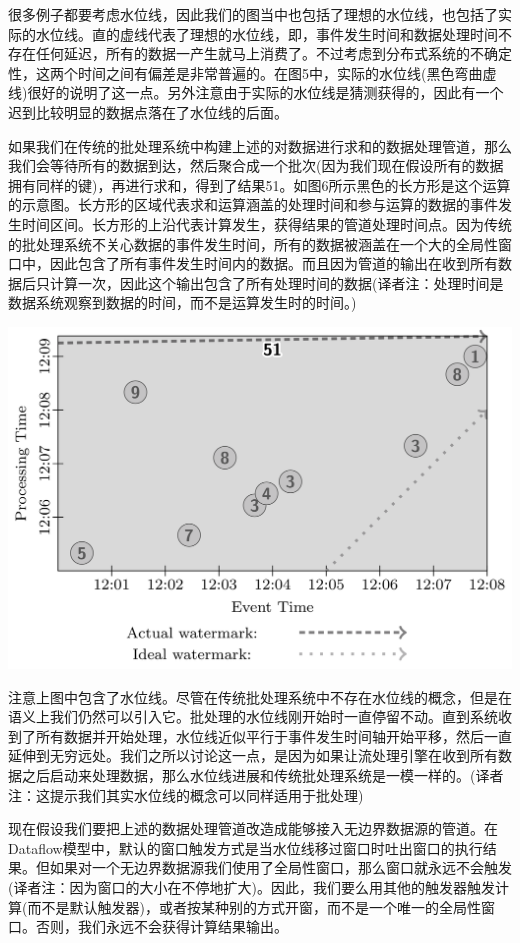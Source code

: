 \documentclass[oneside]{ctexbook}
\begin{document}
很多例子都要考虑水位线，因此我们的图当中也包括了理想的水位线，也包括了实际的水位线。直的虚线代表了理想的水位线，即，事件发生时间和数据处理时间不存在任何延迟，所有的数据一产生就马上消费了。不过考虑到分布式系统的不确定性，这两个时间之间有偏差是非常普遍的。在图5中，实际的水位线(黑色弯曲虚线)很好的说明了这一点。另外注意由于实际的水位线是猜测获得的，因此有一个迟到比较明显的数据点落在了水位线的后面。

如果我们在传统的批处理系统中构建上述的对数据进行求和的数据处理管道，那么我们会等待所有的数据到达，然后聚合成一个批次(因为我们现在假设所有的数据拥有同样的键)，再进行求和，得到了结果51。如图6所示黑色的长方形是这个运算的示意图。长方形的区域代表求和运算涵盖的处理时间和参与运算的数据的事件发生时间区间。长方形的上沿代表计算发生，获得结果的管道处理时间点。因为传统的批处理系统不关心数据的事件发生时间，所有的数据被涵盖在一个大的全局性窗口中，因此包含了所有事件发生时间内的数据。而且因为管道的输出在收到所有数据后只计算一次，因此这个输出包含了所有处理时间的数据(译者注：处理时间是数据系统观察到数据的时间，而不是运算发生时的时间。)

\noindent \includegraphics[width=\textwidth]{batchexecution.png}

注意上图中包含了水位线。尽管在传统批处理系统中不存在水位线的概念，但是在语义上我们仍然可以引入它。批处理的水位线刚开始时一直停留不动。直到系统收到了所有数据并开始处理，水位线近似平行于事件发生时间轴开始平移，然后一直延伸到无穷远处。我们之所以讨论这一点，是因为如果让流处理引擎在收到所有数据之后启动来处理数据，那么水位线进展和传统批处理系统是一模一样的。(译者注：这提示我们其实水位线的概念可以同样适用于批处理)

现在假设我们要把上述的数据处理管道改造成能够接入无边界数据源的管道。在Dataflow模型中，默认的窗口触发方式是当水位线移过窗口时吐出窗口的执行结果。但如果对一个无边界数据源我们使用了全局性窗口，那么窗口就永远不会触发(译者注：因为窗口的大小在不停地扩大)。因此，我们要么用其他的触发器触发计算(而不是默认触发器)，或者按某种别的方式开窗，而不是一个唯一的全局性窗口。否则，我们永远不会获得计算结果输出。
\end{document}
